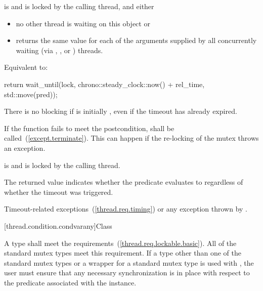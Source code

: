 \begin{itemdescr}
\pnum
\precondition {} is  and 
is locked by the calling thread, and either
\begin{itemize}
\item
no other thread is waiting on this  object or

\item
{} returns the same value for each of the  arguments
supplied by all concurrently waiting (via , , or
) threads.
\end{itemize}

\pnum
\effects Equivalent to:

\begin{codeblock}
return wait_until(lock, chrono::steady_clock::now() + rel_time, std::move(pred));
\end{codeblock}

\pnum
\enternote There is no blocking if  is initially , even if the
timeout has already expired. \exitnote

\pnum
\notes
If the function fails to meet the postcondition, 
shall be called~(\ref{except.terminate}).
\enternote This can happen if the re-locking of the mutex throws an exception. \exitnote

\pnum
\postcondition {} is  and 
is locked by the calling thread.

\pnum
\enternote The returned value indicates whether the predicate evaluates to 
regardless of whether the timeout was triggered. \exitnote

\pnum
\throws Timeout-related
exceptions~(\ref{thread.req.timing}) or any exception thrown by .

\end{itemdescr}

[thread.condition.condvarany]{Class }

\pnum
A  type shall meet the 
requirements~(\ref{thread.req.lockable.basic}). \enternote All of the standard
mutex types meet this requirement. If a  type other than one of the
standard mutex types or a  wrapper for a standard mutex type
is used with , the user must ensure that any
necessary synchronization is in place with respect to the predicate associated
with the  instance. \exitnote

